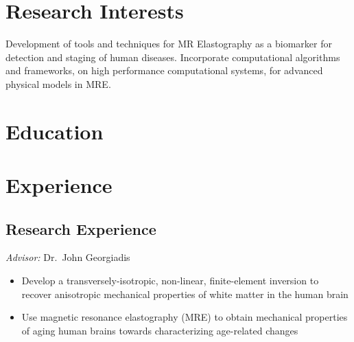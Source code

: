 \documentclass[11pt,letter,sans]{moderncv}
\begin{document}
\setmainfont{Minion Pro}
\setsansfont{Myriad Pro}

\maketitle

\section{Research Interests}

Development of tools and techniques for MR Elastography as a biomarker for detection and staging of human diseases.
Incorporate computational algorithms and frameworks, on high performance computational systems, for advanced physical models in MRE.

\section{Education}





\section{Experience}

\subsection{Research Experience}

%
  {\textit{Advisor:} Dr.\ John Georgiadis
  \begin{itemize}
	\item Develop a transversely-isotropic, non-linear, finite-element inversion to recover anisotropic mechanical properties of white matter in the human brain
  	\item Use magnetic resonance elastography (MRE) to obtain mechanical properties of aging human brains towards characterizing age-related changes
  \end{itemize}
  }
\end{document}
